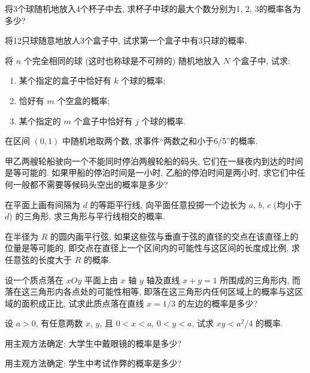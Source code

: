 \begin{xiti}
  \item 将3个球随机地放入4个杯子中去,
  求杯子中球的最大个数分别为1, 2, 3的概率各为多少?

  \item 将12只球随意地放人3个盒子中,
  试求第一个盒子中有3只球的概率.

  \item 将 $n$ 个完全相同的球 (这时也称球是不可辨的) 随机地放入 $N$ 个盒子中,
  试求:
  \begin{enumerate}
    \item 某个指定的盒子中恰好有 $k$ 个球的概率;
    \item 恰好有 $m$ 个空盒的概率;
    \item 某个指定的 $m$ 个盒子中恰好有 $j$ 个球的概率.
  \end{enumerate}

  \item 在区间 $(0,1)$ 中随机地取两个数,
  求事件“两数之和小于6/5”的概率.

  \item 甲乙两艘轮船驶向一个不能同时停泊两艘轮船的码头,
  它们在一昼夜内到达的时间是等可能的.
  如果甲船的停泊时间是一小时,
  乙船的停泊时间是两小时,
  求它们中任何一般都不需要等候码头空出的概率是多少?

  \item 在平面上画有间隔为 $d$ 的等距平行线,
  向平面任意投掷一个边长为 $a$, $b$, $c$ (均小于 $d$) 的三角形,
  求三角形与平行线相交的概率.

  \item 在半径为 $R$ 的圆内画平行弦,
  如果这些弦与垂直于弦的直径的交点在该直径上的位量是等可能的,
  即交点在直径上一个区间内的可能性与这区间的长度成比例,
  求任意弦的长度大于 $R$ 的概率.

  \item 设一个质点落在 $xOy$ 平面上由 $x$ 轴 $y$ 轴及直线 $x + y = 1$ 所围成的三角形内,
  而落在这三角形内各点处的可能性相等,
  即落在这三角形内任何区域上的概率与这区域的面积成正比,
  试求此质点落在直线 $x = 1/3$ 的左边的概率是多少?

  \item 设 $a > 0$,
  有任意两数 $x$, $y$,
  且 $0 < x < a$, $0 < y < a$,
  试求 $xy < a^2 / 4$ 的概率.

  \item 用主观方法确定:
  大学生中戴眼镜的概率是多少?

  \item 用主观方法确定:
  学生中考试作弊的概率是多少?
\end{xiti}

